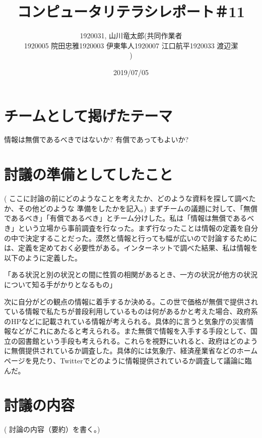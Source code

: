 \documentclass[12pt,a4j]{jarticle}
\begin{document}
\title{コンピュータリテラシレポート＃11}
\author{1920031, 山川竜太郎(共同作業者 

\begin{itemize}
\item 1920005 院田忠雅 
\item1920003 伊東隼人
\item 1920007 江口航平
\item 1920033 渡辺潔
\end{itemize}

)}
\date{2019/07/05}
\maketitle

\section{チームとして掲げたテーマ}
情報は無償であるべきではないか? 有償であってもよいか?

\section{討議の準備としてしたこと}
( ここに討論の前にどのようなことを考えたか、どのような資料を探して調べたか、その他どのような 準備をしたかを記入。)
まずチームの議題に対して、「無償であるべき」「有償であるべき」とチーム分けした。私は「情報は無償であるべき」という立場から事前調査を行なった。まず行なったことは情報の定義を自分の中で決定することだった。漠然と情報と行っても幅が広いので討論するためには、定義を定めておく必要性がある。インターネットで調べた結果、私は情報を以下のように定義した。

「ある状況と別の状況との間に性質の相関があるとき、一方の状況が他方の状況について知る手がかりとなるもの」

次に自分がどの観点の情報に着手するか決める。この世で価格が無償で提供されている情報で私たちが普段利用しているものは何があるかと考えた場合、政府系のHPなどに記載されている情報が考えられる。具体的に言うと気象庁の災害情報などがこれにあたると考えられる。また無償で情報を入手する手段として、国立の図書館という手段も考えられる。これらを視野にいれると、政府はどのように無償提供されているか調査した。具体的には気象庁、経済産業省などのホームページを見たり、Twitterでどのように情報提供されているか調査して議論に臨んだ。

\section{討議の内容}
( 討論の内容（要約）を書く。)
\end{document}

